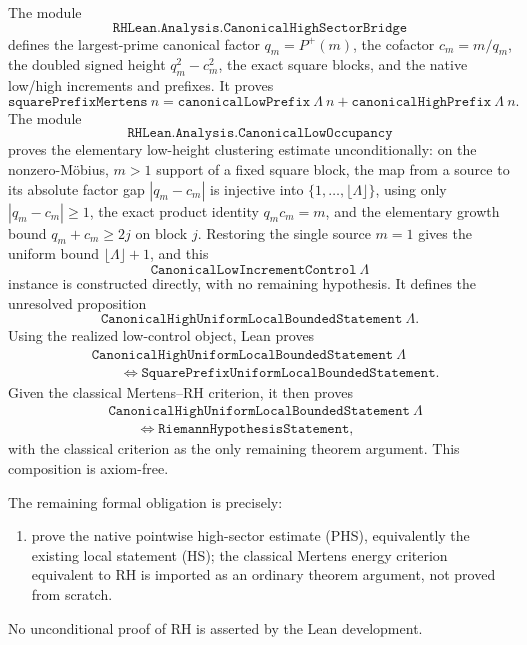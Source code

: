 \documentclass[11pt]{article}
\theoremstyle{definition}
\theoremstyle{remark}
\newcommand{\Pplus}{P^{+}}
\newcommand{\1}{\mathbf{1}}
\begin{document}
The module
\[
 \texttt{RHLean.Analysis.CanonicalHighSectorBridge}
\]
defines the largest-prime canonical factor $q_m=\Pplus(m)$, the cofactor $c_m=m/q_m$, the doubled signed height $q_m^2-c_m^2$, the exact square blocks, and the native low/high increments and prefixes.  It proves
\[
 \texttt{squarePrefixMertens}\ n
 =
 \texttt{canonicalLowPrefix}\ \Lambda\ n
 +
 \texttt{canonicalHighPrefix}\ \Lambda\ n.
\]
The module
\[
 \texttt{RHLean.Analysis.CanonicalLowOccupancy}
\]
proves the elementary low-height clustering estimate unconditionally: on the nonzero-M\"obius, $m>1$ support of a fixed square block, the map from a source to its absolute factor gap $|q_m-c_m|$ is injective into $\{1,\dots,\lfloor\Lambda\rfloor\}$, using only $|q_m-c_m|\ge1$, the exact product identity $q_mc_m=m$, and the elementary growth bound $q_m+c_m\ge2j$ on block $j$.  Restoring the single source $m=1$ gives the uniform bound $\lfloor\Lambda\rfloor+1$, and this
\[
 \texttt{CanonicalLowIncrementControl}\ \Lambda
\]
instance is constructed directly, with no remaining hypothesis.  It defines the unresolved proposition
\[
 \texttt{CanonicalHighUniformLocalBoundedStatement}\ \Lambda.
\]
Using the realized low-control object, Lean proves
\[
 \begin{aligned}
 &\texttt{CanonicalHighUniformLocalBoundedStatement}\ \Lambda\\
 &\qquad\Longleftrightarrow
 \texttt{SquarePrefixUniformLocalBoundedStatement}.
 \end{aligned}
\]
Given the classical Mertens--RH criterion, it then proves
\[
 \boxed{
 \begin{aligned}
 &\texttt{CanonicalHighUniformLocalBoundedStatement}\ \Lambda\\
 &\qquad\Longleftrightarrow
 \texttt{RiemannHypothesisStatement},
 \end{aligned}
 }
\]
with the classical criterion as the only remaining theorem argument.  This composition is axiom-free.

The remaining formal obligation is precisely:
\begin{enumerate}[leftmargin=1.7em,itemsep=0.3em]
\item prove the native pointwise high-sector estimate (PHS), equivalently the existing local statement (HS); the classical Mertens energy criterion equivalent to RH is imported as an ordinary theorem argument, not proved from scratch.
\end{enumerate}

No unconditional proof of RH is asserted by the Lean development.
\end{document}

